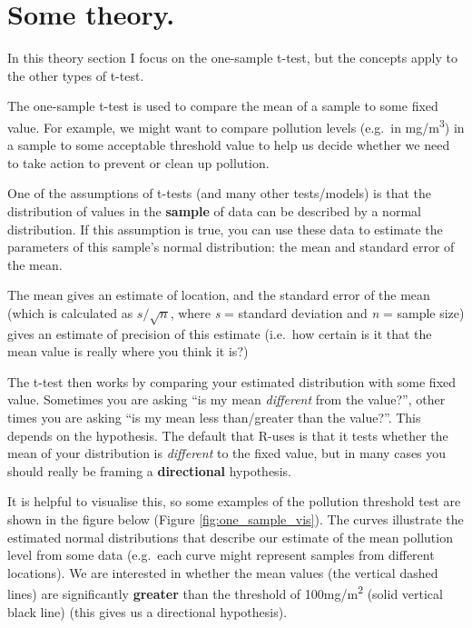 \documentclass[
  a4paperpaper,
]{book}
\begin{document}
\hypertarget{some-theory.}{%
\section{Some theory.}\label{some-theory.}}

In this theory section I focus on the one-sample t-test, but the concepts apply to the other types of t-test.

The one-sample t-test is used to compare the mean of a sample to some fixed value. For example, we might want to compare pollution levels (e.g.~in mg/m\textsuperscript{3}) in a sample to some acceptable threshold value to help us decide whether we need to take action to prevent or clean up pollution.

One of the assumptions of t-tests (and many other tests/models) is that the distribution of values in the \textbf{sample} of data can be described by a normal distribution. If this assumption is true, you can use these data to estimate the parameters of this sample's normal distribution: the mean and standard error of the mean.

The mean gives an estimate of location, and the standard error of the mean (which is calculated as \(s/ \sqrt{n}\), where \emph{s} = standard deviation and \emph{n} = sample size) gives an estimate of precision of this estimate (i.e.~how certain is it that the mean value is really where you think it is?)

The t-test then works by comparing your estimated distribution with some fixed value. Sometimes you are asking ``is my mean \emph{different} from the value?'', other times you are asking ``is my mean less than/greater than the value?''. This depends on the hypothesis. The default that R-uses is that it tests whether the mean of your distribution is \emph{different} to the fixed value, but in many cases you should really be framing a \textbf{directional} hypothesis.

It is helpful to visualise this, so some examples of the pollution threshold test are shown in the figure below (Figure \ref{fig:one_sample_vis}). The curves illustrate the estimated normal distributions that describe our estimate of the mean pollution level from some data (e.g.~each curve might represent samples from different locations). We are interested in whether the mean values (the vertical dashed lines) are significantly \textbf{greater} than the threshold of 100mg/m\textsuperscript{2} (solid vertical black line) (this gives us a directional hypothesis).
\end{document}
